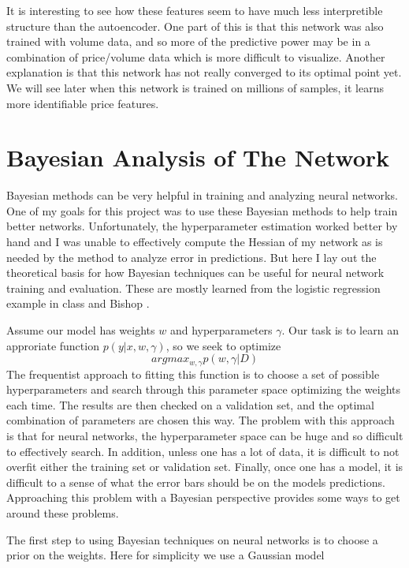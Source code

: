 \documentclass{article}
\begin{document}
It is interesting to see how these features seem to have much less interpretible
structure than the autoencoder. One part of this is that this network was
also trained with volume data, and so more of the predictive power may be in
a combination of price/volume data which is more difficult to visualize.
Another explanation is that this network has not really converged to its optimal
point yet. We will see later when this network is trained on millions of
samples, it learns more identifiable price features.

\section{Bayesian Analysis of The Network}

Bayesian methods can be very helpful in training and analyzing
neural networks. One of my goals for this project was to use
these Bayesian methods to help train better networks. Unfortunately,
the hyperparameter estimation worked better by hand and I was unable
to effectively compute the Hessian of my network as is needed by the
method to analyze error in predictions. But here I lay out the
theoretical basis for how Bayesian techniques can be useful for
neural network training and evaluation. These are mostly learned
from the logistic regression example in class and Bishop \cite{bishop1995neural}.

Assume our model has weights $w$ and hyperparameters $\gamma$. Our task
is to learn an approriate function $p(y|x, w, \gamma)$, so we seek to
optimize
\[ argmax_{w, \gamma} p(w, \gamma |D) \]
The frequentist approach to fitting this function is to choose a set
of possible hyperparameters and search through this parameter space
optimizing the weights each time. The results are then checked on
a validation set, and the optimal combination of parameters are chosen
this way. The problem with this approach is that for neural networks,
the hyperparameter space can be huge and so difficult
to effectively search. In addition, unless one has a lot of data, it is
difficult to not overfit either the training set or validation set. Finally,
once one has a model, it is difficult to a sense of what the error bars should
be on the models predictions. Approaching this problem with a Bayesian 
perspective provides some ways to get around these problems.

The first step to using Bayesian techniques on neural networks is to choose
a prior on the weights. Here for simplicity we use a Gaussian model
\end{document}
